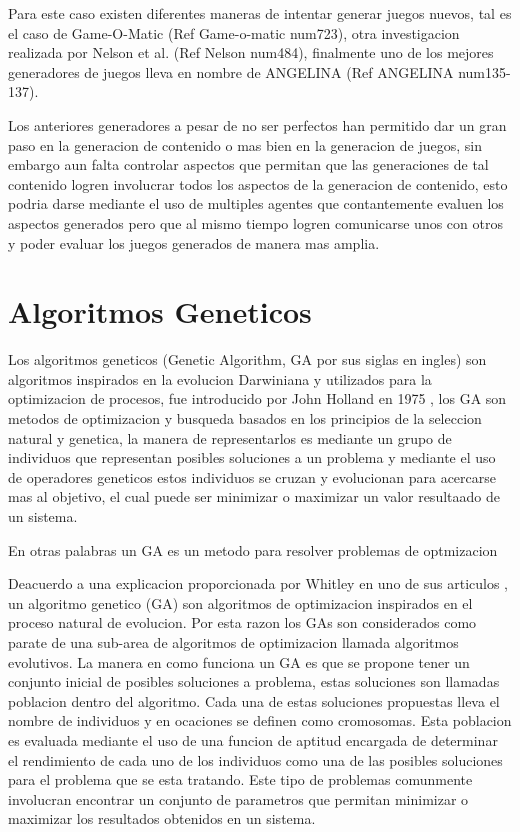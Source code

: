 Para este caso existen diferentes maneras de intentar generar juegos nuevos, tal
es el caso de Game-O-Matic (Ref Game-o-matic num723), otra investigacion realizada
por Nelson et al. (Ref Nelson num484), finalmente uno de los mejores generadores
de juegos lleva en nombre de ANGELINA (Ref ANGELINA num135-137).

Los anteriores generadores a pesar de no ser perfectos han permitido dar un gran
paso en la generacion de contenido o mas bien en la generacion de juegos, sin
embargo aun falta controlar aspectos que permitan que las generaciones de tal
contenido logren involucrar todos los aspectos de la generacion de contenido,
esto podria darse mediante el uso de multiples agentes que contantemente evaluen
los aspectos generados pero que al mismo tiempo logren comunicarse unos con
otros y poder evaluar los juegos generados de manera mas amplia.

\section{Algoritmos Geneticos}
\label{section:genetic-algorithms}

Los algoritmos geneticos (Genetic Algorithm, GA por sus siglas en ingles) son
algoritmos inspirados en la evolucion Darwiniana y utilizados para la
optimizacion de procesos, fue introducido por John Holland en 1975
\cite{Holland1975}, los GA son metodos de optimizacion y busqueda basados en los
principios de la seleccion natural y genetica, la manera de representarlos es
mediante un grupo de individuos que representan posibles soluciones a un
problema y mediante el uso de operadores geneticos estos individuos se cruzan y
evolucionan para acercarse mas al objetivo, el cual puede ser minimizar o
maximizar un valor resultaado de un sistema.

En otras palabras un GA es un metodo para resolver problemas de optmizacion

Deacuerdo a una explicacion proporcionada por Whitley en uno de sus articulos
\cite{Whitley1994}, un algoritmo genetico (GA) son algoritmos de optimizacion
inspirados en el proceso natural de evolucion. Por esta razon los GAs son
considerados como parate de una sub-area de algoritmos de optimizacion llamada
algoritmos evolutivos. La manera en como funciona un GA es que se propone tener
un conjunto inicial de posibles soluciones a problema, estas soluciones son
llamadas poblacion dentro del algoritmo. Cada una de estas soluciones propuestas
lleva el nombre de individuos y en ocaciones se definen como cromosomas. Esta
poblacion es evaluada mediante el uso de una funcion de aptitud encargada de
determinar el rendimiento de cada uno de los individuos como una de las posibles
soluciones para el problema que se esta tratando. Este tipo de problemas
comunmente involucran encontrar un conjunto de parametros que permitan minimizar
o maximizar los resultados obtenidos en un sistema.

